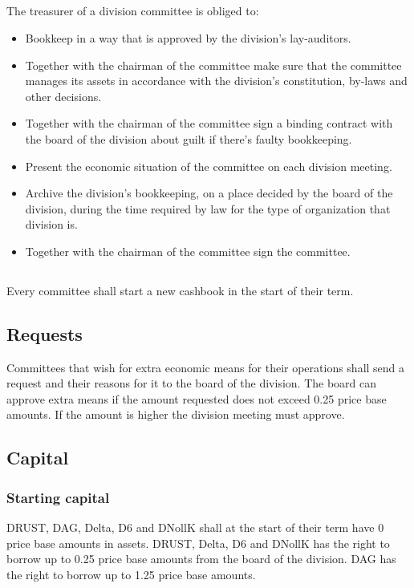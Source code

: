 \documentclass[a4paper]{dtek}
\begin{document}
\subsection{}
The treasurer of a division committee is obliged to:
\begin{itemize}
    \item Bookkeep in a way that is approved by the division's lay-auditors.
    \item Together with the chairman of the committee make sure that the committee manages its assets in accordance with the division's constitution, by-laws and other decisions.
    \item Together with the chairman of the committee sign a binding contract with the board of the division about guilt if there's faulty bookkeeping.
    \item Present the economic situation of the committee on each division meeting.
    \item Archive the division's bookkeeping, on a place decided by the board of the division, during the time required by law for the type of organization that division is.
    \item Together with the chairman of the committee sign the committee.%
\end{itemize}

\subsection{}
Every committee shall start a new cashbook in the start of their term. %

\subsection{Requests}
Committees that wish for extra economic means for their operations shall send a request and their reasons for it to the board of the division. The board can approve extra means if the amount requested does not exceed 0.25 price base amounts. If the amount is higher the division meeting must approve.

\subsection{Capital}
\label{sec:sektionsforeningar_startkapital}
\subsubsection{Starting capital}
DRUST, DAG, Delta, D6 and DNollK shall at the start of their term have 0 price base amounts in assets. DRUST, Delta, D6 and DNollK has the right to borrow up to 0.25 price base amounts from the board of the division. DAG has the right to borrow up to 1.25 price base amounts.
\end{document}

